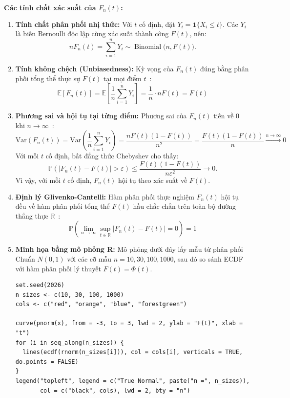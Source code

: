 \documentclass[12pt,a4paper]{article}
\theoremstyle{definition}
\numberwithin{equation}{section}
\begin{document}
	\textbf{Các tính chất xác suất của $F_n(t)$:}
	\begin{enumerate}
		\item \textbf{Tính chất phân phối nhị thức:}
		Với $t$ cố định, đặt $Y_i=\mathbf{1}\{X_i\le t\}$. Các $Y_i$ là
        biến Bernoulli độc lập cùng xác suất thành công $F(t)$, nên:
        \begin{equation}
			nF_n(t)=\sum_{i=1}^{n}Y_i
			\sim \operatorname{Binomial}\bigl(n,F(t)\bigr).
		\end{equation}
		\item \textbf{Tính không chệch (Unbiasedness):} Kỳ vọng của $F_n(t)$ đúng bằng phân phối tổng thể thực sự $F(t)$ tại mọi điểm $t$~\cite[Chương 4]{buithuytrang2026}:
		\begin{equation}
			\mathbb{E}[F_n(t)] = \mathbb{E}\left[\frac{1}{n}\sum_{i=1}^n Y_i\right] = \frac{1}{n} \cdot n F(t) = F(t)
		\end{equation}
		\item \textbf{Phương sai và hội tụ tại từng điểm:} Phương sai của $F_n(t)$ tiến về 0 khi $n \to \infty$~\cite[Chương 4]{buithuytrang2026}:
		\begin{equation}
			\text{Var}\left(F_n(t)\right) = \text{Var}\left(\frac{1}{n}\sum_{i=1}^n Y_i\right) = \frac{n F(t)(1 - F(t))}{n^2} = \frac{F(t)(1 - F(t))}{n} \xrightarrow{n \to \infty} 0
		\end{equation}
		Với mỗi $t$ cố định, bất đẳng thức Chebyshev cho thấy:
		\begin{equation}
			\mathbb{P}\left(\left|F_n(t)-F(t)\right|>\varepsilon\right)
			\leq
			\frac{F(t)(1-F(t))}{n\varepsilon^2}
			\longrightarrow 0.
		\end{equation}
		Vì vậy, với mỗi $t$ cố định, $F_n(t)$ hội tụ theo xác suất về $F(t)$.
		\item \textbf{Định lý Glivenko-Cantelli:} Hàm phân phối thực nghiệm $F_n(t)$ hội tụ đều về hàm phân phối tổng thể $F(t)$ hầu chắc chắn trên toàn bộ đường thẳng thực $\mathbb{R}$~\cite[tr. 10--12]{efron1993}:
		\begin{equation}
			\mathbb{P}\left( \lim_{n \to \infty} \sup_{t \in \mathbb{R}} |F_n(t) - F(t)| = 0 \right) = 1
		\end{equation}

	\newpage
		\item \textbf{Minh họa bằng mô phỏng R:} Mô phỏng dưới đây lấy mẫu từ phân phối Chuẩn $N(0,1)$ với các cỡ mẫu $n=10,30,100,1000$, sau đó so sánh ECDF với hàm phân phối lý thuyết $F(t)=\Phi(t)$.

	\begin{lstlisting}[style=Rstyle, caption={Mô phỏng ECDF}]
set.seed(2026)
n_sizes <- c(10, 30, 100, 1000)
cols <- c("red", "orange", "blue", "forestgreen")

curve(pnorm(x), from = -3, to = 3, lwd = 2, ylab = "F(t)", xlab = "t")
for (i in seq_along(n_sizes)) {
  lines(ecdf(rnorm(n_sizes[i])), col = cols[i], verticals = TRUE, do.points = FALSE)
}
legend("topleft", legend = c("True Normal", paste("n =", n_sizes)),
       col = c("black", cols), lwd = 2, bty = "n")
	\end{lstlisting}
	\end{enumerate}
\end{document}
